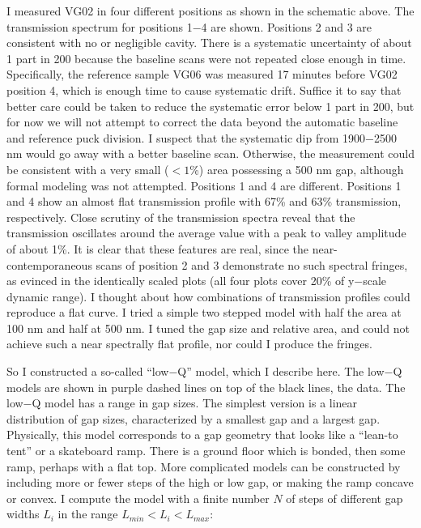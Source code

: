 I measured VG02 in four different positions as shown in the schematic above.  The transmission spectrum for positions 1$-$4 are shown.  Positions 2 and 3 are consistent with no or negligible cavity.  There is a systematic uncertainty of about 1 part in 200 because the baseline scans were not repeated close enough in time.  Specifically, the reference sample VG06 was measured 17 minutes before VG02 position 4, which is enough time to cause systematic drift.  Suffice it to say that better care could be taken to reduce the systematic error below 1 part in 200, but for now we will not attempt to correct the data beyond the automatic baseline and reference puck division.  I suspect that the systematic dip from 1900$-$2500 nm would go away with a better baseline scan.  Otherwise, the measurement could be consistent with a very small ($<1$\%) area possessing a 500 nm gap, although formal modeling was not attempted.  Positions 1 and 4 are different.  Positions 1 and 4 show an almost flat transmission profile with 67\% and 63\% transmission, respectively.  Close scrutiny of the transmission spectra reveal that the transmission oscillates around the average value with a peak to valley amplitude of about 1\%.  It is clear that these features are real, since the near-contemporaneous scans of position 2 and 3 demonstrate no such spectral fringes, as evinced in the identically scaled plots (all four plots cover 20\% of y$-$scale dynamic range).  I thought about how combinations of transmission profiles could reproduce a flat curve.  I tried a simple two stepped model with half the area at 100 nm and half at 500 nm.  I tuned the gap size and relative area, and could not achieve such a near spectrally flat profile, nor could I produce the fringes.  

So I constructed a so-called ``low$-$Q'' model, which I describe here.  The low$-$Q models are shown in purple dashed lines on top of the black lines, the data.  The low$-$Q model has a range in gap sizes.  The simplest version is a linear distribution of gap sizes, characterized by a smallest gap and a largest gap.  Physically, this model corresponds to a gap geometry that looks like a ``lean-to tent'' or a skateboard ramp.  There is a ground floor which is bonded, then some ramp, perhaps with a flat top.  More complicated models can be constructed by including more or fewer steps of the high or low gap, or making the ramp concave or convex.  I compute the model with a finite number $N$ of steps of different gap widths $L_i$ in the range $L_{min} < L_i < L_{max}$:

